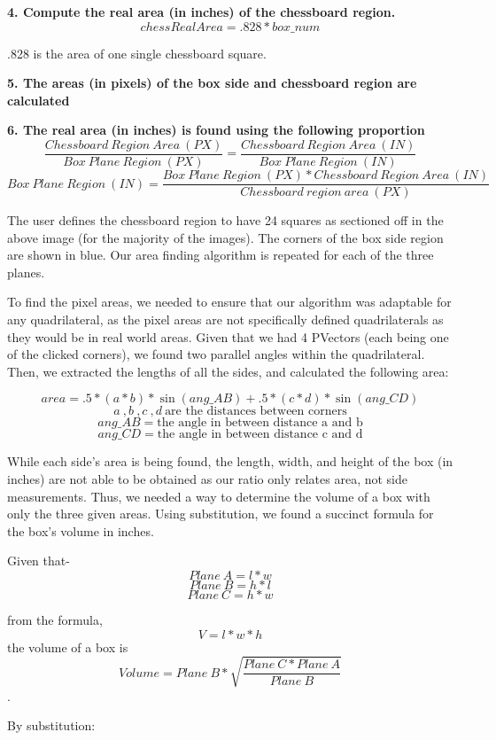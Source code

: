 \documentclass[11pt, twoside, reqno]{book}
\begin{document}
\textbf{4. Compute the real area (in inches) of the chessboard region.}
 \[chessRealArea = .828*box\_num\] 
 \begin{center}
.828 is the area of one single chessboard square.
 \end{center} 
 
  \textbf{5. The areas (in pixels) of the box side and chessboard region are calculated}
 
 
  \textbf{6. The real area (in inches) is found using the following proportion}
  \[ \frac{Chessboard\ Region\ Area\ (PX)}{Box\ Plane\ Region\ (PX)} = \frac{Chessboard\ Region\ Area\ (IN)}{Box\ Plane\ Region\ (IN)}  \]
   \[ {Box\ Plane\ Region\ (IN)} = \frac{Box\ Plane\ Region\ (PX)*Chessboard\ Region\ Area\ (IN)}{Chessboard\ region\ area\ (PX)}  \]


The user defines the chessboard region to have 24 squares as sectioned off in the above image (for the majority of the images). The corners of the box side region are shown in blue. Our area finding algorithm is repeated for each of the three planes.

To find the pixel areas, we needed to ensure that our algorithm was adaptable for any quadrilateral, as the pixel areas are not specifically defined quadrilaterals as they would be in real world areas. Given that we had 4 PVectors (each being one of the clicked corners), we found two parallel angles within the quadrilateral. Then, we extracted the lengths of all the sides, and calculated the following area:


\[area = .5*(a*b)*\sin(ang\_AB) + .5*(c*d)*\sin(ang\_CD)\] 
\[a\ ,b\ ,c\ ,d\ \textrm{are\ the\ distances\ between\ corners}\]
\[ang\_AB = \textrm{the\ angle\ in\ between\ distance\ a\ and\ b}\]
\[ang\_CD = \textrm{the\ angle\ in\ between\ distance\ c\ and\ d}\]

 While each side's area is being found, the length, width, and height of the box (in inches) are not able to be obtained as our ratio only relates area, not side measurements. Thus, we needed a way to determine the volume of a box with only the three given areas. Using substitution, we found a succinct formula for the box's volume in inches. 

Given that-
\[Plane\ A = l*w\]
\[Plane\ B = h*l\]
\[Plane\ C = h*w\]


from the formula, \[V = l*w*h\] the volume of a box is \[Volume =Plane\ B*\sqrt{\frac{Plane\ C*Plane\ A}{Plane\ B}} \].

By substitution:
\end{document}
